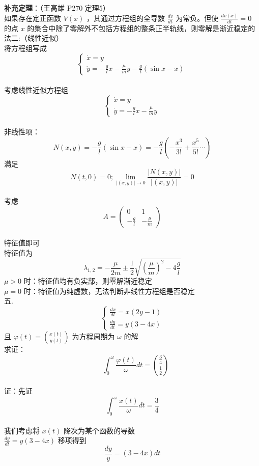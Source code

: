 \documentclass[UTF8]{ctexart}
\begin{document}
\textbf{补充定理}：（王高雄 P270 定理5）\\
如果存在定正函数 $V(x)$ ，其通过方程组的全导数 $\frac{d v}{d t}$ 为常负。但使 $\frac{d v(x)}{d t}=0$ 的点 $x$ 的集合中除了零解外不包括方程组的整条正半轨线，则零解是渐近稳定的\\
法二:（线性近似）\\
将方程组写成 $$\left\{\begin{array}{l}\dot{x}=y \\ \dot{y}=-\frac{g}{l} x-\frac{\mu}{m} y-\frac{g}{l}(\sin x-x)\end{array}\right.$$\\
考虑线性近似方程组 $$\left\{\begin{array}{l}\dot{x}=y \\ \dot{y}=-\frac{g}{l} x-\frac{\mu}{m} y\end{array}\right.$$\\
非线性项：\\
$$
N(x, y)=-\frac{g}{l}(\sin x-x)=-\frac{g}{l}\left(-\frac{x^{3}}{3!}+\frac{x^{5}}{5!} \cdots\right)
$$
满足 $$N(t, 0)=0 ; \lim _{|(x, y)| \rightarrow 0} \frac{|N(x, y)|}{|(x, y)|}=0$$\\
考虑 \\$$A=\left(\begin{array}{cc}0 & 1 \\ -\frac{g}{l} & -\frac{\mu}{m}\end{array}\right)$$ \\特征值即可\\
特征值为 $$\lambda_{1,2}=-\frac{\mu}{2 m} \pm \frac{1}{2}\sqrt{\left(\frac{\mu}{m}\right)^{2}-4 \frac{g}{l}}$$
$\mu>0$ 时：特征值均有负实部，则零解渐近稳定\\
$\mu=0$ 时：特征值为纯虚数，无法判断非线性方程组是否稳定\\
五.\\
$$
\left\{\begin{array}{l}
\frac{d x}{d t}=x(2 y-1) \\
\frac{d y}{d t}=y(3-4 x)
\end{array}\right.
$$
且 $\varphi(t)=\binom{x(t)}{y(t)}$ 为方程周期为 $\omega$ 的解\\
求证：$$\quad \int_{0}^{\omega} \frac{\varphi(t)}{\omega} d t=\binom{\frac{3}{4}}{\frac{1}{2}}$$\\
证：先证 $$\int_{0}^{\omega} \frac{x(t)}{\omega} d t=\frac{3}{4}$$ \\
我们考虑将 $x(t)$ 降次为某个函数的导数\\
$\frac{d y}{d t}=y(3-4 x)$ 移项得到 $$\frac{d y}{y}=(3-4 x) d t$$ \\
\end{document}
